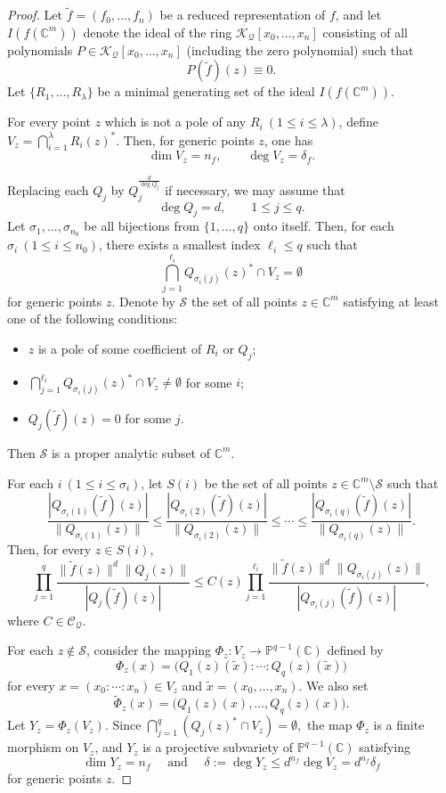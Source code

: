 \documentclass[12pt,leqno]{amsart}
\newcommand{\C}{{\mathbb{C}}}
\renewcommand{\P}{{\mathbb{P}}}
\numberwithin{equation}{section}
\begin{document}
\begin{proof}
Let $\tilde f=(f_0,\ldots,f_n)$ be a reduced representation of $f$, and let $I(f(\C^m))$ denote the ideal of the ring $\mathcal K_{\mathcal Q}[x_0,\ldots,x_n]$ consisting of all polynomials $P\in \mathcal K_{\mathcal Q}[x_0,\ldots,x_n]$ (including the zero polynomial) such that
$$P(\tilde f)(z)\equiv 0.$$
Let $\{R_1,\ldots,R_\lambda\}$ be a minimal generating set of the ideal $I(f(\C^m))$.

For every point $z$ which is not a pole of any $R_i\ (1\le i\le \lambda)$, define $V_z=\bigcap_{i=1}^\lambda R_i(z)^*.$
Then, for generic points $z$, one has
$$\dim V_z=n_f,\qquad \deg V_z=\delta_f.$$

Replacing each $Q_j$ by $Q_j^{\frac d{\deg Q_j}}$ if necessary, we may assume that
$$\deg Q_j=d,\qquad 1\le j\le q.$$
Let $\sigma_1,\ldots,\sigma_{n_0}$ be all bijections from $\{1,\ldots,q\}$ onto itself. Then, for each $\sigma_i\ (1\le i\le n_0)$, there exists a smallest index $\ell_i\le q$ such that
$$\bigcap_{j=1}^{\ell_i}Q_{\sigma_i(j)}(z)^*\cap V_z=\emptyset$$
for generic points $z$.
Denote by $\mathcal S$ the set of all points $z\in\C^m$ satisfying at least one of the following conditions:
\begin{itemize}
\item $z$ is a pole of some coefficient of $R_i$ or $Q_j$;
\item $\bigcap_{j=1}^{\ell_i}Q_{\sigma_i(j)}(z)^*\cap V_z\ne\emptyset$ for some $i$;
\item $Q_j(\tilde f)(z)=0$ for some $j$.
\end{itemize}
Then $\mathcal S$ is a proper analytic subset of $\C^m$.

For each $i\ (1\le i\le \sigma_i)$, let $S(i)$ be the set of all points $z\in\C^m\setminus\mathcal S$ such that
$$
\frac{|Q_{\sigma_i(1)}(\tilde f)(z)|}{\|Q_{\sigma_i(1)}(z)\|}
\le
\frac{|Q_{\sigma_i(2)}(\tilde f)(z)|}{\|Q_{\sigma_i(2)}(z)\|}
\le\cdots\le
\frac{|Q_{\sigma_i(q)}(\tilde f)(z)|}{\|Q_{\sigma_i(q)}(z)\|}.
$$
Then, for every $z\in S(i)$,
$$
\prod_{j=1}^q
\frac{\|\tilde f(z)\|^d\|Q_j(z)\|}{|Q_j(\tilde f)(z)|}
\le
C(z)\prod_{j=1}^{\ell_i}
\frac{\|\tilde f(z)\|^d\|Q_{\sigma_i(j)}(z)\|}{|Q_{\sigma_i(j)}(\tilde f)(z)|},
$$
where $C\in\mathcal C_{\mathcal Q}$.

For each $z\notin\mathcal S$, consider the mapping $\Phi_z:V_z\longrightarrow \P^{q-1}(\C)$ defined by
$$
\Phi_z(x)=\bigl(Q_1(z)(\tilde x):\cdots:Q_q(z)(\tilde x)\bigr)
$$
for every $x=(x_0:\cdots:x_n)\in V_z$ and $\tilde x=(x_0,\ldots,x_n).$
We also set
$$
\tilde\Phi_z(x)=\bigl(Q_1(z)(x),\ldots,Q_q(z)(x)\bigr).
$$
Let $Y_z=\Phi_z(V_z).$ Since $\bigcap_{j=1}^q(Q_j(z)^*\cap V_z)=\emptyset,$
the map $\Phi_z$ is a finite morphism on $V_z$, and $Y_z$ is a projective subvariety of $\P^{q-1}(\C)$ satisfying
$$\dim Y_z=n_f\quad\text{ and }\quad\delta:=\deg Y_z\le d^{n_f}\deg V_z=d^{n_f}\delta_f$$
for generic points $z$.


\end{proof}
\end{document}
